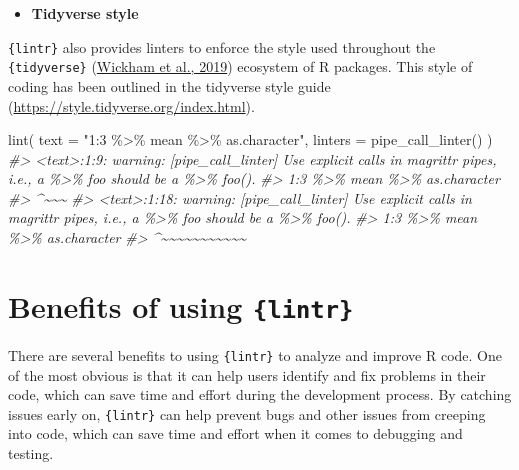 \documentclass[10pt,a4paper,onecolumn]{article}
\newenvironment{Shaded}{\begin{snugshade}}{\end{snugshade}}
\newcommand{\AttributeTok}[1]{\textcolor[rgb]{0.77,0.63,0.00}{#1}}
\newcommand{\CommentTok}[1]{\textcolor[rgb]{0.56,0.35,0.01}{\textit{#1}}}
\newcommand{\FunctionTok}[1]{\textcolor[rgb]{0.00,0.00,0.00}{#1}}
\newcommand{\NormalTok}[1]{#1}
\newcommand{\StringTok}[1]{\textcolor[rgb]{0.31,0.60,0.02}{#1}}
\providecommand{\tightlist}{%
  \setlength{\itemsep}{0pt}\setlength{\parskip}{0pt}}
\begin{document}
\begin{itemize}
\tightlist
\item
  \textbf{Tidyverse style}
\end{itemize}

\texttt{\{lintr\}} also provides linters to enforce the style used
throughout the \texttt{\{tidyverse\}}
(\protect\hyperlink{ref-Wickham2019}{Wickham et al., 2019}) ecosystem of
R packages. This style of coding has been outlined in the tidyverse
style guide (\url{https://style.tidyverse.org/index.html}).

\begin{Shaded}
\begin{Highlighting}[]
\FunctionTok{lint}\NormalTok{(}
  \AttributeTok{text =} \StringTok{"1:3 \%\textgreater{}\% mean \%\textgreater{}\% as.character"}\NormalTok{,}
  \AttributeTok{linters =} \FunctionTok{pipe\_call\_linter}\NormalTok{()}
\NormalTok{)}
\CommentTok{\#\textgreater{} \textless{}text\textgreater{}:1:9: warning: [pipe\_call\_linter] Use explicit calls in magrittr pipes, i.e., \textasciigrave{}a \%\textgreater{}\% foo\textasciigrave{} should be \textasciigrave{}a \%\textgreater{}\% foo()\textasciigrave{}.}
\CommentTok{\#\textgreater{} 1:3 \%\textgreater{}\% mean \%\textgreater{}\% as.character}
\CommentTok{\#\textgreater{}         \^{}\textasciitilde{}\textasciitilde{}\textasciitilde{}}
\CommentTok{\#\textgreater{} \textless{}text\textgreater{}:1:18: warning: [pipe\_call\_linter] Use explicit calls in magrittr pipes, i.e., \textasciigrave{}a \%\textgreater{}\% foo\textasciigrave{} should be \textasciigrave{}a \%\textgreater{}\% foo()\textasciigrave{}.}
\CommentTok{\#\textgreater{} 1:3 \%\textgreater{}\% mean \%\textgreater{}\% as.character}
\CommentTok{\#\textgreater{}                  \^{}\textasciitilde{}\textasciitilde{}\textasciitilde{}\textasciitilde{}\textasciitilde{}\textasciitilde{}\textasciitilde{}\textasciitilde{}\textasciitilde{}\textasciitilde{}\textasciitilde{}}
\end{Highlighting}
\end{Shaded}

\hypertarget{benefits-of-using-lintr}{%
\section{\texorpdfstring{Benefits of using
\texttt{\{lintr\}}}{Benefits of using \{lintr\}}}\label{benefits-of-using-lintr}}

There are several benefits to using \texttt{\{lintr\}} to analyze and
improve R code. One of the most obvious is that it can help users
identify and fix problems in their code, which can save time and effort
during the development process. By catching issues early on,
\texttt{\{lintr\}} can help prevent bugs and other issues from creeping
into code, which can save time and effort when it comes to debugging and
testing.
\end{document}
